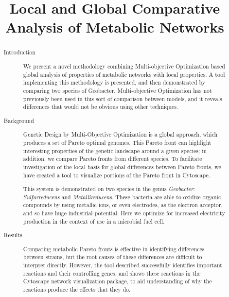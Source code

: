 \documentclass[a4paper]{article}
\begin{document}
\title{Local and Global Comparative Analysis of Metabolic Networks}
\date{}
\maketitle
\begin{abstract}
\begin{description}
\item[]

\item[Introduction] 
We present a novel methodology combining Multi-objective Optimization based global analysis of properties of metabolic networks with local properties. A tool implementing this methodology is presented, and then demonstrated by comparing two species of Geobacter. Multi-objective Optimization has not previously been used in this sort of comparison between models, and it reveals differences that would not be obvious using other techniques.

\item[Background]
Genetic Design by Multi-Objective Optimization is a global approach, which produces a set of Pareto optimal genomes. This Pareto front can highlight interesting properties of the genetic landscape around a given species; in addition, we compare Pareto fronts from different species. To facilitate investigation of the local basis for global  differences between Pareto fronts, we have created a tool to visualize portions of the Pareto front in Cytoscape.

This system is demonstrated on two species in the genus {\it Geobacter}: {\it Sulfurreducens} and {\it Metallireducens}. These bacteria are able to oxidize organic compounds by using metallic ions, or even electrodes, as the electron acceptor, and so have huge industrial potential. Here we optimize for increased electricity production in the context of use in a microbial fuel cell.

\item[Results]
Comparing metabolic Pareto fronts is effective in identifying differences between strains, but the root causes of these differences are difficult to interpret directly. However, the tool described successfully identifies important reactions and their controlling genes, and shows these reactions in the Cytoscape network visualization package, to aid understanding of why the reactions produce the effects that they do.


\end{description}
\end{abstract}
\end{document}
